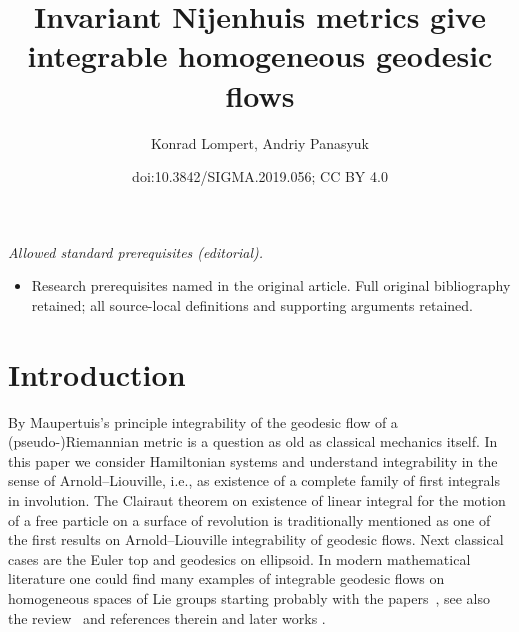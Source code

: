 \documentclass[10pt,a4paper]{amsart}
\title{Invariant Nijenhuis metrics give integrable homogeneous geodesic flows}
\author{Konrad Lompert, Andriy Panasyuk}
\date{doi:10.3842/SIGMA.2019.056; CC BY 4.0}
\numberwithin{equation}{section}
\begin{document}
\maketitle
\noindent\textit{Allowed standard prerequisites (editorial).}\begin{itemize}
\item Research prerequisites named in the original article. Full original bibliography retained; all source-local definitions and supporting arguments retained.
\end{itemize}\medskip
\section{Introduction}

By Maupertuis's principle integrability of the geodesic flow of a (pseudo-)Riemannian metric is a question as old as classical mechanics itself. In this paper we consider Hamiltonian systems and understand integrability in the sense of Arnold--Liouville, i.e., as existence of a complete family of first integrals in involution. The Clairaut theorem on existence of linear integral for the motion of a free particle on a surface of revolution is traditionally mentioned as one of the first results on Arnold--Liouville integrability of geodesic flows. Next classical cases are the Euler top and geodesics on ellipsoid. In modern mathematical literature one could find many examples of integrable geodesic flows on homogeneous spaces of Lie groups starting probably with the papers~\cite{mishch,thimm}, see also the review~\cite{bjObzor} and references therein and later works \cite{DGJ,jovanovic10,mykSuborb,p4}.
\end{document}
